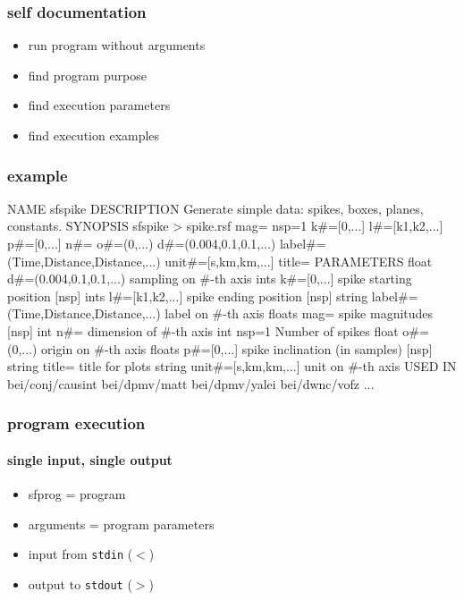 \begin{frame} \frametitle{self documentation}

  \begin{itemize}
  \item run program without arguments
  \item find program purpose
  \item find execution parameters
  \item find execution examples
  \end{itemize}

\end{frame}
\cwpnote{}

\begin{frame}[fragile] \frametitle{example}


\tiny
\begin{semiverbatim}
NAME
        sfspike
DESCRIPTION
        Generate simple data: spikes, boxes, planes, constants.
SYNOPSIS
        sfspike > spike.rsf mag= nsp=1 k#=[0,...] l#=[k1,k2,...] p#=[0,...] n#=
o#=(0,...) d#=(0.004,0.1,0.1,...) label#=(Time,Distance,Distance,...) unit#=[s,km,km,...] title=
PARAMETERS
        float   d#=(0.004,0.1,0.1,...)  sampling on #-th axis
        ints    k#=[0,...]      spike starting position  [nsp]
        ints    l#=[k1,k2,...]  spike ending position  [nsp]
        string  label#=(Time,Distance,Distance,...)     label on #-th axis
        floats  mag=    spike magnitudes  [nsp]
        int     n#=     dimension of #-th axis
        int     nsp=1   Number of spikes
        float   o#=(0,...)      origin on #-th axis
        floats  p#=[0,...]      spike inclination (in samples)  [nsp]
        string  title=  title for plots
        string  unit#=[s,km,km,...]     unit on #-th axis
USED IN
        bei/conj/causint
        bei/dpmv/matt
        bei/dpmv/yalei
        bei/dwnc/vofz
	...
\end{semiverbatim}
\end{frame}
\cwpnote{}

\begin{frame} \frametitle{program execution}
  \framesubtitle{single input, single output}


  \vfill

  \begin{itemize}
  \item sfprog = \mg program
  \item arguments = program parameters
  \item input from \texttt{stdin} ($<$)
  \item output to \texttt{stdout} ($>$)
  \end{itemize}

\end{frame}
\cwpnote{}

